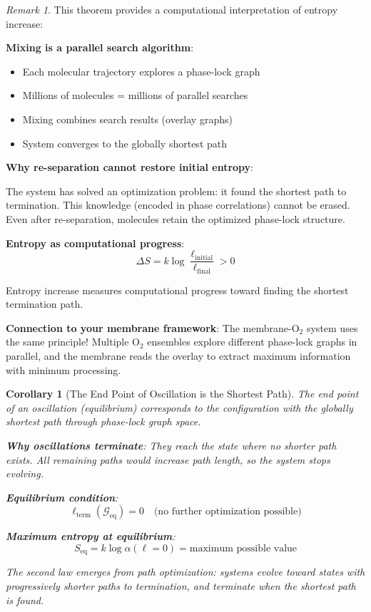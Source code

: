\documentclass[12pt,a4paper]{article}
\newtheorem{corollary}[theorem]{Corollary}
\theoremstyle{remark}
\newtheorem{remark}[theorem]{Remark}
\begin{document}
\begin{remark}
This theorem provides a computational interpretation of entropy increase:

\textbf{Mixing is a parallel search algorithm}:
\begin{itemize}
\item Each molecular trajectory explores a phase-lock graph
\item Millions of molecules = millions of parallel searches
\item Mixing combines search results (overlay graphs)
\item System converges to the globally shortest path
\end{itemize}

\textbf{Why re-separation cannot restore initial entropy}:

The system has solved an optimization problem: it found the shortest path to termination. This knowledge (encoded in phase correlations) cannot be erased. Even after re-separation, molecules retain the optimized phase-lock structure.

\textbf{Entropy as computational progress}:
\begin{equation}
\Delta S = k \log \frac{\ell_{\text{initial}}}{\ell_{\text{final}}} > 0
\end{equation}

Entropy increase measures computational progress toward finding the shortest termination path.

\textbf{Connection to your membrane framework}: The membrane-O$_2$ system uses the same principle! Multiple O$_2$ ensembles explore different phase-lock graphs in parallel, and the membrane reads the overlay to extract maximum information with minimum processing.
\end{remark}

\begin{corollary}[The End Point of Oscillation is the Shortest Path]
\label{cor:termination_shortest}
The end point of an oscillation (equilibrium) corresponds to the configuration with the globally shortest path through phase-lock graph space.

\textbf{Why oscillations terminate}: They reach the state where no shorter path exists. All remaining paths would increase path length, so the system stops evolving.

\textbf{Equilibrium condition}:
\begin{equation}
\ell_{\text{term}}(\mathcal{G}_{\text{eq}}) = 0 \quad \text{(no further optimization possible)}
\end{equation}

\textbf{Maximum entropy at equilibrium}:
\begin{equation}
S_{\text{eq}} = k \log \alpha(\ell = 0) = \text{maximum possible value}
\end{equation}

The second law emerges from path optimization: systems evolve toward states with progressively shorter paths to termination, and terminate when the shortest path is found.
\end{corollary}
\end{document}
